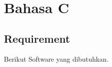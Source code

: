 \documentclass[12pt,]{article}
\begin{document}
%	
%
%
%	

	\newpage
	\section{Bahasa C}
	
	\subsection{Requirement}
	
	Berikut Software yang dibutuhkan.
	
\end{document}
